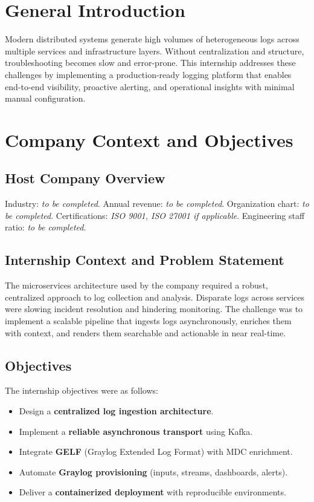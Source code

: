 \documentclass[12pt,a4paper]{report}
\begin{document}
\clearpage
\chapter*{General Introduction}
Modern distributed systems generate high volumes of heterogeneous logs across multiple services and infrastructure layers. Without centralization and structure, troubleshooting becomes slow and error-prone. This internship addresses these challenges by implementing a production-ready logging platform that enables end-to-end visibility, proactive alerting, and operational insights with minimal manual configuration.

\chapter{Company Context and Objectives}
\section{Host Company Overview}
Industry: \textit{to be completed}. Annual revenue: \textit{to be completed}. Organization chart: \textit{to be completed}. Certifications: \textit{ISO 9001, ISO 27001 if applicable}. Engineering staff ratio: \textit{to be completed}.

\section{Internship Context and Problem Statement}
The microservices architecture used by the company required a robust, centralized approach to log collection and analysis. Disparate logs across services were slowing incident resolution and hindering monitoring. The challenge was to implement a scalable pipeline that ingests logs asynchronously, enriches them with context, and renders them searchable and actionable in near real-time.

\section{Objectives}
The internship objectives were as follows:
\begin{itemize}[leftmargin=1.2cm]
    \item Design a \textbf{centralized log ingestion architecture}.
    \item Implement a \textbf{reliable asynchronous transport} using Kafka.
    \item Integrate \textbf{GELF} (Graylog Extended Log Format) with MDC enrichment.
    \item Automate \textbf{Graylog provisioning} (inputs, streams, dashboards, alerts).
    \item Deliver a \textbf{containerized deployment} with reproducible environments.
\end{itemize}
\end{document}

